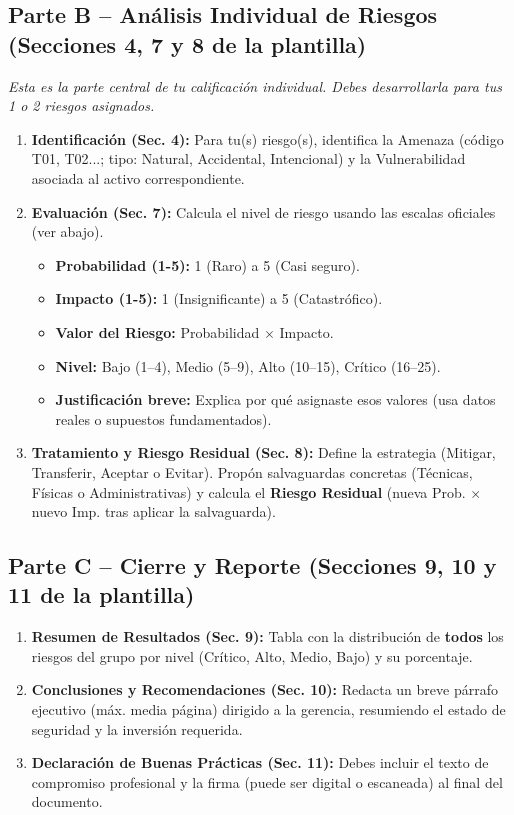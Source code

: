 \documentclass[11pt,a4paper]{article}
\begin{document}
\subsection{Parte B -- Análisis Individual de Riesgos (Secciones 4, 7 y 8 de la plantilla)}
\textit{Esta es la parte central de tu calificación individual. Debes desarrollarla para tus 1 o 2 riesgos asignados.}

\begin{enumerate}
    \item \textbf{Identificación (Sec. 4):} Para tu(s) riesgo(s), identifica la Amenaza (código T01, T02...; tipo: Natural, Accidental, Intencional) y la Vulnerabilidad asociada al activo correspondiente.
    \item \textbf{Evaluación (Sec. 7):} Calcula el nivel de riesgo usando las escalas oficiales (ver abajo). 
    \begin{itemize}
        \item \textbf{Probabilidad (1-5):} 1 (Raro) a 5 (Casi seguro).
        \item \textbf{Impacto (1-5):} 1 (Insignificante) a 5 (Catastrófico).
        \item \textbf{Valor del Riesgo:} Probabilidad $\times$ Impacto.
        \item \textbf{Nivel:} Bajo (1--4), Medio (5--9), Alto (10--15), Crítico (16--25).
        \item \textbf{Justificación breve:} Explica por qué asignaste esos valores (usa datos reales o supuestos fundamentados).
    \end{itemize}
    \item \textbf{Tratamiento y Riesgo Residual (Sec. 8):} Define la estrategia (Mitigar, Transferir, Aceptar o Evitar). Propón salvaguardas concretas (Técnicas, Físicas o Administrativas) y calcula el \textbf{Riesgo Residual} (nueva Prob. $\times$ nuevo Imp. tras aplicar la salvaguarda).
\end{enumerate}

\subsection{Parte C -- Cierre y Reporte (Secciones 9, 10 y 11 de la plantilla)}
\begin{enumerate}
    \item \textbf{Resumen de Resultados (Sec. 9):} Tabla con la distribución de \textbf{todos} los riesgos del grupo por nivel (Crítico, Alto, Medio, Bajo) y su porcentaje.
    \item \textbf{Conclusiones y Recomendaciones (Sec. 10):} Redacta un breve párrafo ejecutivo (máx. media página) dirigido a la gerencia, resumiendo el estado de seguridad y la inversión requerida.
    \item \textbf{Declaración de Buenas Prácticas (Sec. 11):} Debes incluir el texto de compromiso profesional y la firma (puede ser digital o escaneada) al final del documento.
\end{enumerate}
\end{document}
